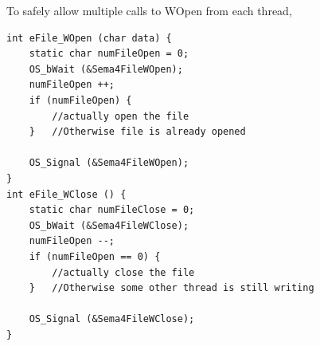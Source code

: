\documentclass[a4paper]{article}
\begin{document}
To safely allow multiple calls to WOpen from each thread, 
{ \lstset{language=C, frame=none, numbers=none}
\begin{lstlisting}
int eFile_WOpen (char data) {
	static char numFileOpen = 0;
	OS_bWait (&Sema4FileWOpen);
	numFileOpen ++;
	if (numFileOpen) {
		//actually open the file
	} 	//Otherwise file is already opened
	
	OS_Signal (&Sema4FileWOpen);
}
int eFile_WClose () {
	static char numFileClose = 0;
	OS_bWait (&Sema4FileWClose);
	numFileOpen --;
	if (numFileOpen == 0) {
		//actually close the file
	} 	//Otherwise some other thread is still writing
	
	OS_Signal (&Sema4FileWClose);
}

\end{lstlisting}
}

\end{document}
